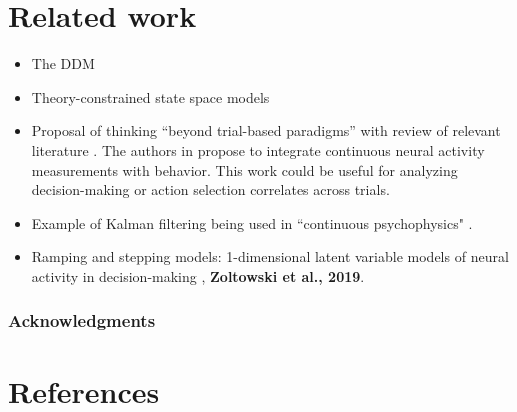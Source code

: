 \documentclass{article}
\begin{document}
\section{Related work}
\begin{itemize}
\item The DDM \cite{ratcliff2008diffusion,gold2007neural}
\item Theory-constrained state space models \cite{inderman2017using}
\item Proposal of thinking ``beyond trial-based paradigms'' with review of relevant literature \cite{huk2018beyond}. The authors in  \cite{huk2018beyond} propose to integrate continuous neural activity measurements with behavior. This work could be useful for analyzing decision-making or action selection correlates across trials.
\item Example of Kalman filtering being used in ``continuous psychophysics" \cite{bonnen2015continuous}.
\item Ramping and stepping models: 1-dimensional latent variable models of neural activity in decision-making \cite{latimer2015single}, \textbf{Zoltowski et al., 2019}. 
\end{itemize}

\subsubsection*{Acknowledgments}


\section*{References}

\medskip

\small

%

\end{document}
